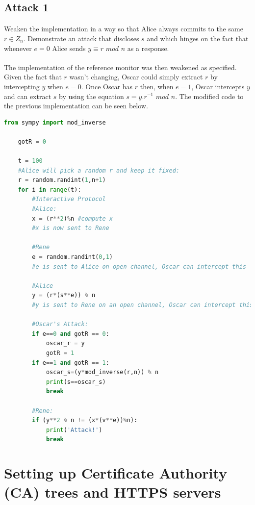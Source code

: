 \documentclass[12pt, twoside]{report}
\begin{document}
	\subsection{Attack 1}
	
	\paragraph{ }Weaken the implementation in a way so that Alice always commits to the same $r \in Z_n$. Demonstrate an attack that discloses $s$ and which hinges on the fact that whenever $e = 0$ Alice sends $y ≡ r$ $mod$ $n$ as a response.
	
	\paragraph{ }The implementation of the reference monitor was then weakened as specified. Given the fact that $r$ wasn't changing, Oscar could simply extract $r$ by intercepting $y$ when $e=0$. Once Oscar has $r$ then, when $e=1$, Oscar intercepts $y$ and can extract $s$ by using the equation $s=y.r^{-1}$ $mod$ $n$. The modified code to the previous implementation can be seen below.
	
	\begin{lstlisting}[language=Python]
	from sympy import mod_inverse
	
	gotR = 0
	
	t = 100
	#Alice will pick a random r and keep it fixed:
	r = random.randint(1,n+1)
	for i in range(t):
		#Interactive Protocol
		#Alice:
		x = (r**2)%n #compute x
		#x is now sent to Rene
		
		#Rene
		e = random.randint(0,1)
		#e is sent to Alice on open channel, Oscar can intercept this
		
		#Alice
		y = (r*(s**e)) % n
		#y is sent to Rene on an open channel, Oscar can intercept this
		
		#Oscar's Attack:
		if e==0 and gotR == 0:
			oscar_r = y
			gotR = 1
		if e==1 and gotR == 1:
			oscar_s=(y*mod_inverse(r,n)) % n
			print(s==oscar_s)
			break
	
		#Rene:
		if (y**2 % n != (x*(v**e))%n):
			print('Attack!')
			break
	\end{lstlisting}
	
	
	\pagebreak
	\section{Setting up Certificate Authority (CA) trees and HTTPS servers}
\end{document}
